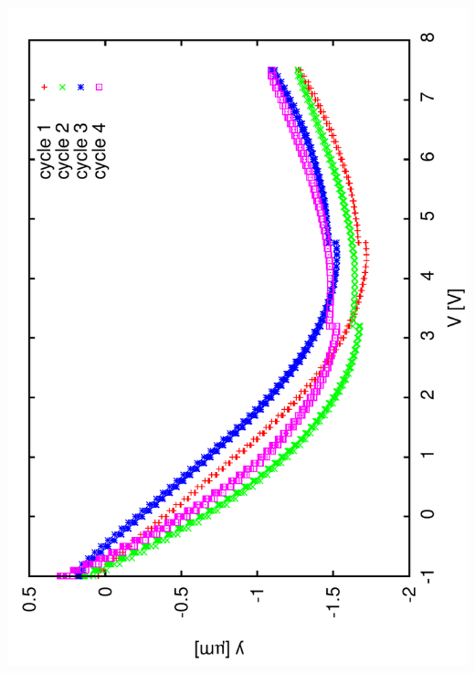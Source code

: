 \documentclass[a4paper,11pt]{book}
\begin{document}
\includegraphics[angle=-90,scale=0.10]{image72.pdf}\hspace*{2cm}
\end{document}
